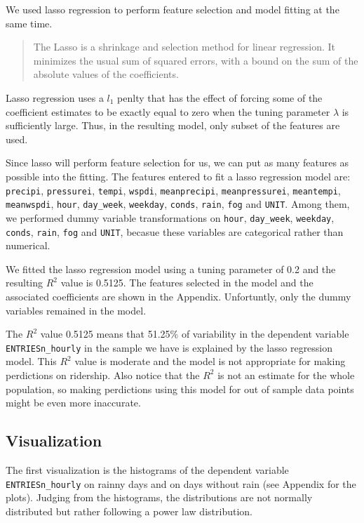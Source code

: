 \documentclass{article}
\begin{document}
We used lasso regression to perform feature selection and model fitting
at the same time.

\begin{quote}
The Lasso is a shrinkage and selection method for linear regression. It
minimizes the usual sum of squared errors, with a bound on the sum of
the absolute values of the coefficients.
\end{quote}

Lasso regression uses a $l_1$ penlty that has the effect of forcing some
of the coefficient estimates to be exactly equal to zero when the tuning
parameter $\lambda$ is sufficiently large. Thus, in the resulting model,
only subset of the features are used.

Since lasso will perform feature selection for us, we can put as many
features as possible into the fitting. The features entered to fit a
lasso regression model are: \texttt{precipi}, \texttt{pressurei},
\texttt{tempi}, \texttt{wspdi}, \texttt{meanprecipi},
\texttt{meanpressurei}, \texttt{meantempi}, \texttt{meanwspdi},
\texttt{hour}, \texttt{day\_week}, \texttt{weekday}, \texttt{conds},
\texttt{rain}, \texttt{fog} and \texttt{UNIT}. Among them, we performed
dummy variable transformations on \texttt{hour}, \texttt{day\_week},
\texttt{weekday}, \texttt{conds}, \texttt{rain}, \texttt{fog} and
\texttt{UNIT}, becasue these variables are categorical rather than
numerical.

We fitted the lasso regression model using a tuning parameter of 0.2 and
the resulting $R^2$ value is 0.5125. The features selected in the model
and the associated coefficients are shown in the Appendix. Unfortuntly,
only the dummy variables remained in the model.

The $R^2$ value 0.5125 means that 51.25\% of variability in the
dependent variable \texttt{ENTRIESn\_hourly} in the sample we have is
explained by the lasso regression model. This $R^2$ value is moderate
and the model is not appropriate for making perdictions on ridership.
Also notice that the $R^2$ is not an estimate for the whole population,
so making perdictions using this model for out of sample data points
might be even more inaccurate.

    \subsection{Visualization}\label{visualization}

The first visualization is the histograms of the dependent variable
\texttt{ENTRIESn\_hourly} on rainny days and on days without rain (see
Appendix for the plots). Judging from the histograms, the distributions
are not normally distributed but rather following a power law
distribution.
\end{document}
